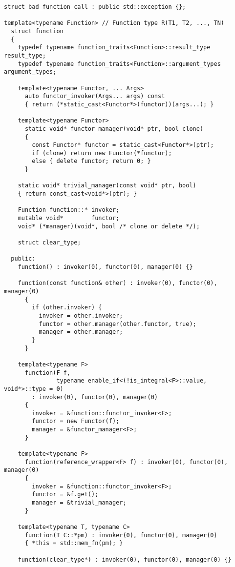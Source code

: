 \documentclass{article}
\begin{document}
\small
\begin{verbatim}
struct bad_function_call : public std::exception {};

template<typename Function> // Function type R(T1, T2, ..., TN)
  struct function
  {
    typedef typename function_traits<Function>::result_type result_type;
    typedef typename function_traits<Function>::argument_types argument_types;

    template<typename Functor, ... Args>
      auto functor_invoker(Args... args) const
      { return (*static_cast<Functor*>(functor))(args...); }
    
    template<typename Functor> 
      static void* functor_manager(void* ptr, bool clone)
      { 
        const Functor* functor = static_cast<Functor*>(ptr);
        if (clone) return new Functor(*functor); 
        else { delete functor; return 0; }
      }

    static void* trivial_manager(const void* ptr, bool)
    { return const_cast<void*>(ptr); }

    Function function::* invoker;
    mutable void*        functor;
    void* (*manager)(void*, bool /* clone or delete */);

    struct clear_type;

  public:
    function() : invoker(0), functor(0), manager(0) {}
    
    function(const function& other) : invoker(0), functor(0), manager(0)
      { 
        if (other.invoker) {
          invoker = other.invoker;
          functor = other.manager(other.functor, true);
          manager = other.manager;
        }
      }

    template<typename F> 
      function(F f, 
               typename enable_if<(!is_integral<F>::value, void*>::type = 0) 
        : invoker(0), functor(0), manager(0)
      {
        invoker = &function::functor_invoker<F>;
        functor = new Functor(f);
        manager = &functor_manager<F>;
      }

    template<typename F> 
      function(reference_wrapper<F> f) : invoker(0), functor(0), manager(0)
      { 
        invoker = &function::functor_invoker<F>;
        functor = &f.get();
        manager = &trivial_manager;
      }
    
    template<typename T, typename C> 
      function(T C::*pm) : invoker(0), functor(0), manager(0)
      { *this = std::mem_fn(pm); }

    function(clear_type*) : invoker(0), functor(0), manager(0) {}
    

\end{verbatim}
\end{document}
